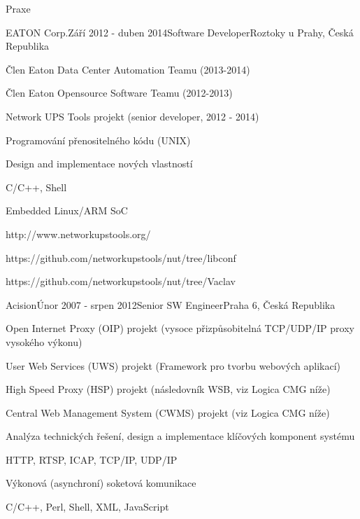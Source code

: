\documentclass{resume} %
\begin{document}
\begin{rSection}{Praxe}

\begin{rSubsection}{EATON Corp.}{Z\'{a}\v{r}\'{i} 2012 - duben 2014}{Software Developer}{Roztoky u Prahy, \v{C}esk\'{a} Republika}
\item \v{C}len Eaton Data Center Automation Teamu (2013-2014)
\item \v{C}len Eaton Opensource Software Teamu (2012-2013)
\item Network UPS Tools projekt (senior developer, 2012 - 2014)
\item Programov\'{a}n\'{i} p\v{r}enositeln\'{e}ho k\'{o}du (UNIX)
\item Design and implementace nov\'{y}ch vlastnost\'{i}
\item C/C++, Shell
\item Embedded Linux/ARM SoC
\item http://www.networkupstools.org/
\item https://github.com/networkupstools/nut/tree/libconf
\item https://github.com/networkupstools/nut/tree/Vaclav
\end{rSubsection}


\begin{rSubsection}{Acision}{\'{U}nor 2007 - srpen 2012}{Senior SW Engineer}{Praha 6, \v{C}esk\'{a} Republika}
\item Open Internet Proxy (OIP) projekt (vysoce p\v{r}izp\r{u}sobiteln\'{a} TCP/UDP/IP proxy vysok\'{e}ho v\'{y}konu)
\item User Web Services (UWS) projekt (Framework pro tvorbu webov\'{y}ch aplikac\'{i})
\item High Speed Proxy (HSP) projekt (n\'{a}sledovn\'{i}k WSB, viz Logica CMG n\'{i}\v{z}e)
\item Central Web Management System (CWMS) projekt (viz Logica CMG n\'{i}\v{z}e)
\item Anal\'{y}za technick\'{y}ch \v{r}e\v{s}en\'{i}, design a implementace kl\'{i}\v{c}ov\'{y}ch komponent syst\'{e}mu
\item HTTP, RTSP, ICAP, TCP/IP, UDP/IP
\item V\'{y}konov\'{a} (asynchron\'{i}) soketov\'{a} komunikace
\item C/C++, Perl, Shell, XML, JavaScript
\end{rSubsection}



\end{rSection}
\end{document}
